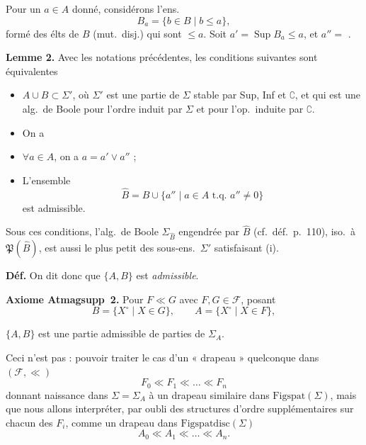 \documentclass[11pt,a4paper]{article}
\begin{document}
 Pour un $a \in A$ donné, considérons l'ens.
\[
  B_a = \{ b \in B \mid b \le a \} ,
\]
formé des élts de $B$ (mut.\ disj.) qui sont $\le a$. Soit $a' = \operatorname{Sup} B_a \le a$, et $a'' =$ .

\textbf{Lemme 2.} Avec les notations précédentes, les conditions suivantes sont équivalentes
\begin{itemize}
  \item[(i)] $A \cup B \subset \Sigma'$, où $\Sigma'$ est une partie de $\Sigma$ stable par Sup, Inf et $\complement$, et qui est une alg.\ de Boole pour l'ordre induit par $\Sigma$ et pour l'op.\ induite par $\complement$.
  \item[(ii)] On a
\end{itemize}
\begin{itemize}
  \item[a)] $\forall a \in A$, on a $a = a' \vee a''$ ;
  \item[b)]  L'ensemble
  \[
    \widehat{B} = B \cup \{ a'' \mid a \in A \text{ t.q. } a'' \ne 0 \}
  \]
  est admissible.
\end{itemize}
Sous ces conditions, l'alg.\ de Boole $\Sigma_{\widehat{B}}$ engendrée par $\widehat{B}$ (cf.\ déf.\ p.~110),  iso.\ à $\mathfrak{P}(\widehat{B})$, est aussi le plus petit des sous-ens.\ $\Sigma'$ satisfaisant (i).

\textbf{Déf.} On dit donc que $\{A, B\}$ est \textit{admissible}.

\textbf{Axiome Atmagsupp~2.} Pour   $F \ll G$ avec $F, G \in \mathcal{F}$, posant
\[
  B = \{ X^\circ \mid X \in G \}, \qquad A = \{ X^\circ \mid X \in F \} ,
\]

 $\{A, B\}$ est une partie admissible de parties de $\Sigma_A$.

Ceci n'est pas  :   \ill{} pouvoir traiter le cas d'un « drapeau » quelconque dans $(\mathcal{F}, \ll)$
\[
  F_0 \ll F_1 \ll \dots \ll F_n
\]
donnant naissance dans $\Sigma = \Sigma_A$ à un drapeau similaire dans $\mathrm{Figspat}(\Sigma)$, mais que \struck{\ill{}} nous allons interpréter, par oubli des structures d'ordre supplémentaires sur \struck{\ill{}} chacun des $F_i$, comme un drapeau dans $\mathrm{Figspatdisc}(\Sigma)$
\[
  A_0 \ll A_1 \ll \dots \ll A_n .
\]
\end{document}
